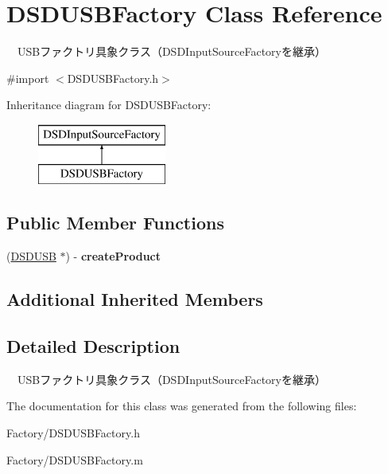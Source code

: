 \hypertarget{interface_d_s_d_u_s_b_factory}{\section{D\-S\-D\-U\-S\-B\-Factory Class Reference}
\label{interface_d_s_d_u_s_b_factory}
}


　\-U\-S\-Bファクトリ具象クラス（\-D\-S\-D\-Input\-Source\-Factoryを継承）  




{\ttfamily \#import $<$D\-S\-D\-U\-S\-B\-Factory.\-h$>$}

Inheritance diagram for D\-S\-D\-U\-S\-B\-Factory\-:\begin{figure}[H]
\begin{center}
\leavevmode
\includegraphics[height=2.000000cm]{interface_d_s_d_u_s_b_factory}
\end{center}
\end{figure}
\subsection*{Public Member Functions}
\begin{DoxyCompactItemize}
\item 
\hypertarget{interface_d_s_d_u_s_b_factory_aa27d3df249426f6714a17fd9593f09c0}{(\hyperlink{interface_d_s_d_u_s_b}{D\-S\-D\-U\-S\-B} $\ast$) -\/ {\bfseries create\-Product}}\label{interface_d_s_d_u_s_b_factory_aa27d3df249426f6714a17fd9593f09c0}

\end{DoxyCompactItemize}
\subsection*{Additional Inherited Members}


\subsection{Detailed Description}
　\-U\-S\-Bファクトリ具象クラス（\-D\-S\-D\-Input\-Source\-Factoryを継承） 

The documentation for this class was generated from the following files\-:\begin{DoxyCompactItemize}
\item 
Factory/D\-S\-D\-U\-S\-B\-Factory.\-h\item 
Factory/D\-S\-D\-U\-S\-B\-Factory.\-m\end{DoxyCompactItemize}
